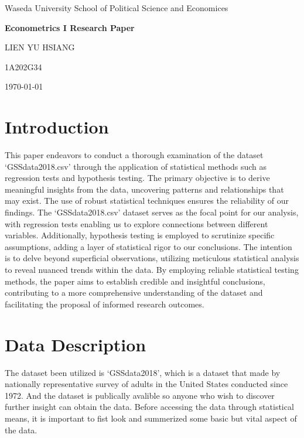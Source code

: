 \documentclass{article}[13pt]
\begin{document}
\begin{titlepage}
    \centering
    \vspace*{5cm}
    {\Large Waseda University School of Political Science and Economices}\par
    \vspace{1cm}
    {\LARGE \textbf{Econometrics I Research Paper}}\par
    \vspace{1cm}
    {\Large LIEN YU HSIANG}\par
    \vspace{1cm}
    {\Large 1A202G34}\par
    \vspace{1cm}
    {\Large \today}\par
    \vspace{2cm}
\end{titlepage}

\section{Introduction}


\qquad This paper endeavors to conduct a thorough examination of the dataset `GSSdata2018.csv' through the application of statistical methods such as regression tests and hypothesis testing. The primary objective is to derive meaningful insights from the data, uncovering patterns and relationships that may exist. The use of robust statistical techniques ensures the reliability of our findings.
The `GSSdata2018.csv' dataset serves as the focal point for our analysis, with regression tests enabling us to explore connections between different variables. Additionally, hypothesis testing is employed to scrutinize specific assumptions, adding a layer of statistical rigor to our conclusions.
The intention is to delve beyond superficial observations, utilizing meticulous statistical analysis to reveal nuanced trends within the data. By employing reliable statistical testing methods, the paper aims to establish credible and insightful conclusions, contributing to a more comprehensive understanding of the dataset and facilitating the proposal of informed research outcomes.

\section{Data Description}

\qquad The dataset been utilized is `GSSdata2018', which is a dataset that made by 
nationally representative survey of adults in the United States conducted since 1972. 
And the dataset is publically avalible so anyone who wish to discover further insight can 
obtain the data. Before accessing the data through statistical means, it is important to fist look 
and summerized some basic but vital aspect of the data. 
\newline
\end{document}
